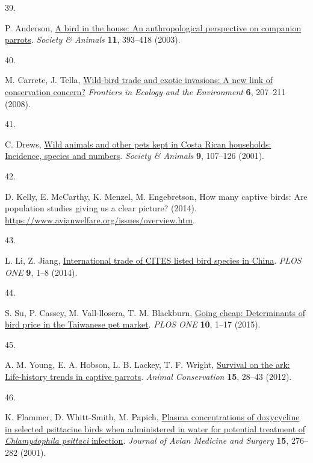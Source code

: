 \documentclass[
  man,floatsintext]{apa6}
\newlength{\cslhangindent}
\newlength{\csllabelwidth}
\newlength{\cslentryspacingunit} %
\newenvironment{CSLReferences}[2] %
 {%
  \setlength{\parindent}{0pt}
  \ifodd #1
  \let\oldpar\par
  \def\par{\hangindent=\cslhangindent\oldpar}
  \fi
  \setlength{\parskip}{#2\cslentryspacingunit}
 }%
 {}
\newcommand{\CSLLeftMargin}[1]{\parbox[t]{\csllabelwidth}{#1}}
\newcommand{\CSLRightInline}[1]{\parbox[t]{\linewidth - \csllabelwidth}{#1}\break}
\begin{document}
\begin{CSLReferences}{0}{0}
\leavevmode{}%
\CSLLeftMargin{39. }%
\CSLRightInline{P. Anderson, \href{https://doi.org/10.1163/156853003322796109}{A bird in the house: An anthropological perspective on companion parrots}. \emph{Society \& Animals} \textbf{11}, 393--418 (2003).}

\leavevmode{}%
\CSLLeftMargin{40. }%
\CSLRightInline{M. Carrete, J. Tella, \href{https://doi.org/10.1890/070075}{Wild-bird trade and exotic invasions: A new link of conservation concern?} \emph{Frontiers in Ecology and the Environment} \textbf{6}, 207--211 (2008).}

\leavevmode{}%
\CSLLeftMargin{41. }%
\CSLRightInline{C. Drews, \href{https://doi.org/10.1163/156853001753639233}{Wild animals and other pets kept in {C}osta {R}ican households: Incidence, species and numbers}. \emph{Society \& Animals} \textbf{9}, 107--126 (2001).}

\leavevmode{}%
\CSLLeftMargin{42. }%
\CSLRightInline{D. Kelly, E. McCarthy, K. Menzel, M. Engebretson, How many captive birds: Are population studies giving us a clear picture? (2014). \url{https://www.avianwelfare.org/issues/overview.htm}.}

\leavevmode{}%
\CSLLeftMargin{43. }%
\CSLRightInline{L. Li, Z. Jiang, \href{https://doi.org/10.1371/journal.pone.0085012}{International trade of {CITES} listed bird species in {C}hina}. \emph{PLOS ONE} \textbf{9}, 1--8 (2014).}

\leavevmode{}%
\CSLLeftMargin{44. }%
\CSLRightInline{S. Su, P. Cassey, M. Vall-llosera, T. M. Blackburn, \href{https://doi.org/10.1371/journal.pone.0127482}{Going cheap: Determinants of bird price in the {T}aiwanese pet market}. \emph{PLOS ONE} \textbf{10}, 1--17 (2015).}

\leavevmode{}%
\CSLLeftMargin{45. }%
\CSLRightInline{A. M. Young, E. A. Hobson, L. B. Lackey, T. F. Wright, \href{https://doi.org/10.1111/j.1469-1795.2011.00477.x}{Survival on the ark: Life-history trends in captive parrots}. \emph{Animal Conservation} \textbf{15}, 28--43 (2012).}

\leavevmode{}%
\CSLLeftMargin{46. }%
\CSLRightInline{K. Flammer, D. Whitt-Smith, M. Papich, \href{https://doi.org/10.1647/1082-6742(2001)015\%5B0276:PCODIS\%5D2.0.CO;2}{Plasma concentrations of doxycycline in selected psittacine birds when administered in water for potential treatment of \emph{{C}hlamydophila psittaci} infection}. \emph{Journal of Avian Medicine and Surgery} \textbf{15}, 276--282 (2001).}


\end{CSLReferences}
\end{document}
